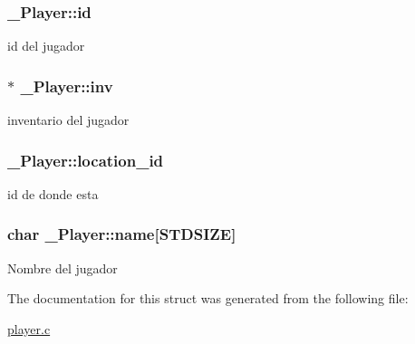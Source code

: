 \subsubsection[{\texorpdfstring{id}{id}}]{ \+\_\+\+Player\+::id}\hypertarget{struct__Player_a60d635cd063816a9c1bd873f4868bb90}{}\label{struct__Player_a60d635cd063816a9c1bd873f4868bb90}
id del jugador 
\subsubsection[{\texorpdfstring{inv}{inv}}]{$\ast$ \+\_\+\+Player\+::inv}\hypertarget{struct__Player_aaaeeb03326c37ce62c333c2b94fde23c}{}\label{struct__Player_aaaeeb03326c37ce62c333c2b94fde23c}
inventario del jugador 
\subsubsection[{\texorpdfstring{location\+\_\+id}{location_id}}]{ \+\_\+\+Player\+::location\+\_\+id}\hypertarget{struct__Player_aca2cb83e7a18dea36c33ad94e36a1e54}{}\label{struct__Player_aca2cb83e7a18dea36c33ad94e36a1e54}
id de donde esta 
\subsubsection[{\texorpdfstring{name}{name}}]{\setlength{\rightskip}{0pt plus 5cm}char \+\_\+\+Player\+::name\mbox{[}{\bf S\+T\+D\+S\+I\+ZE}\mbox{]}}\hypertarget{struct__Player_abd3fbad9568ff1e608654d58e71b8c58}{}\label{struct__Player_abd3fbad9568ff1e608654d58e71b8c58}
Nombre del jugador 

The documentation for this struct was generated from the following file\+:\begin{DoxyCompactItemize}
\item 
\hyperlink{player_8c}{player.\+c}\end{DoxyCompactItemize}
